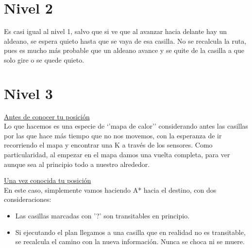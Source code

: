 \documentclass[11pt,a4paper]{article}
\begin{document}
\section*{Nivel 2}

Es casi igual al nivel 1, salvo que si ve que al avanzar hacia delante hay un aldeano, se espera quieto hasta que se vaya de esa casilla. No se recalcula la ruta, pues es mucho más probable que un aldeano avance y se quite de la casilla a que solo gire o se quede quieto.

\section*{Nivel 3}


\underline{Antes de conocer tu posición} \\

Lo que hacemos es una especie de `'mapa de calor'' considerando antes las casillas por las que hace más tiempo que no nos movemos, con la esperanza de ir recorriendo el mapa y encontrar una K a través de los sensores. Como particularidad, al empezar en el mapa damos una vuelta completa, para ver aunque sea al principio todo a nuestro alrededor.

\underline{Una vez conocida tu posición} \\

En este caso, simplemente vamos haciendo A* hacia el destino, con dos consideraciones:
\begin{itemize}
	\item Las casillas marcadas con '?' son transitables en principio.
	\item Si ejecutando el plan llegamos a una casilla que en realidad no es transitable, se recalcula el camino con la nueva información. Nunca se choca ni se muere.
\end{itemize}
\end{document}
